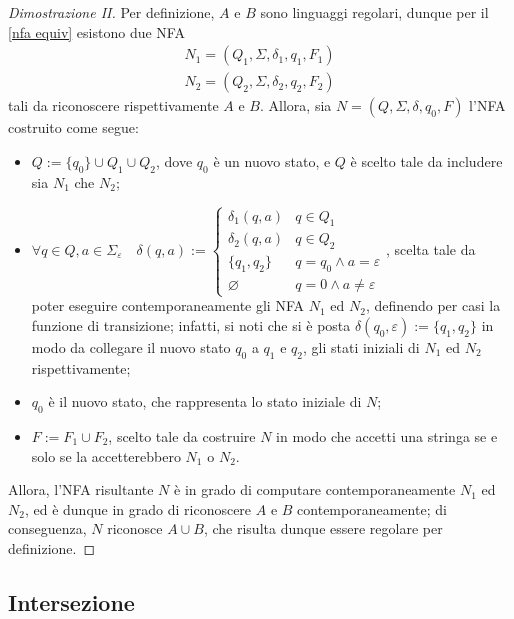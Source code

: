 \documentclass[a4paper, 12pt]{report}
\begin{document}
    \begin{proof}[Dimostrazione II]
        Per definizione, $A$ e $B$ sono linguaggi regolari, dunque per il \cref{nfa equiv} esistono due NFA $$\left. \begin{array}{c}N_1 = (Q_1, \Sigma, \delta_1, q_1, F_1) \\ N_2 = (Q_2, \Sigma, \delta_2, q_2, F_2) \end{array} \right.$$ tali da riconoscere rispettivamente $A$ e $B$. Allora, sia $N = (Q, \Sigma, \delta, q_0, F)$ l'NFA costruito come segue:

        \begin{itemize}
            \item $Q := \{q_0\} \cup Q_1 \cup Q_2$, dove $q_0$ è un nuovo stato, e $Q$ è scelto tale da includere sia $N_1$ che $N_2$;
            \item $\forall q \in Q, a \in \Sigma_{\varepsilon} \quad \delta(q, a) := \left \{ \begin{array}{ll} \delta_1(q, a) & q \in Q_1 \\ \delta_2(q, a) & q \in Q_2 \\ \{q_1, q_2\} & q = q_0 \land a = \varepsilon \\ \varnothing & q = 0 \land a \neq \varepsilon \end{array} \right.$, scelta tale da poter eseguire contemporaneamente gli NFA $N_1$ ed $N_2$, definendo per casi la funzione di transizione; infatti, si noti che si è posta $\delta(q_0, \varepsilon) := \{q_1, q_2\}$ in modo da collegare il nuovo stato $q_0$ a $q_1$ e $q_2$, gli stati iniziali di $N_1$ ed $N_2$ rispettivamente;
            \item $q_0$ è il nuovo stato, che rappresenta lo stato iniziale di $N$;
            \item $F := F_1 \cup F_2$, scelto tale da costruire $N$ in modo che accetti una stringa se e solo se la accetterebbero $N_1$ o $N_2$.
        \end{itemize}


        Allora, l'NFA risultante $N$ è in grado di computare contemporaneamente $N_1$ ed $N_2$, ed è dunque in grado di riconoscere $A$ e $B$ contemporaneamente; di conseguenza, $N$ riconosce $A \cup B$, che risulta dunque essere regolare per definizione.
    \end{proof}

    \subsection{Intersezione}
\end{document}
